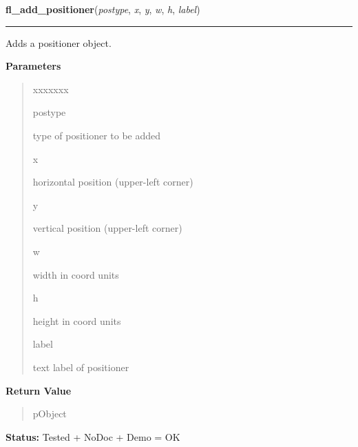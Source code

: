 \hspace{.8\funcindent}\begin{boxedminipage}{\funcwidth}

    \raggedright \textbf{fl\_add\_positioner}(\textit{postype}, \textit{x}, \textit{y}, \textit{w}, \textit{h}, \textit{label})

    \vspace{-1.5ex}

    \rule{\textwidth}{0.5\fboxrule}
\setlength{\parskip}{2ex}
    Adds a positioner object.

\setlength{\parskip}{1ex}
      \textbf{Parameters}
      \vspace{-1ex}

      \begin{quote}
        \begin{Ventry}{xxxxxxx}

          \item[postype]

          type of positioner to be added

          \item[x]

          horizontal position (upper-left corner)

          \item[y]

          vertical position (upper-left corner)

          \item[w]

          width in coord units

          \item[h]

          height in coord units

          \item[label]

          text label of positioner

        \end{Ventry}

      \end{quote}

      \textbf{Return Value}
    \vspace{-1ex}

      \begin{quote}
      pObject

      \end{quote}

\textbf{Status:} Tested + NoDoc + Demo = OK



    \end{boxedminipage}

